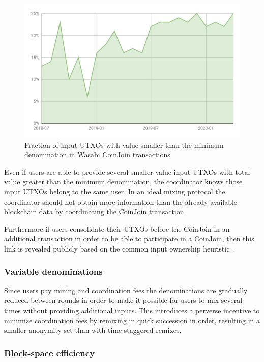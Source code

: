 \documentclass{article}
\begin{document}
\begin{figure}[h!]
    \centering
    \includegraphics[scale=0.4]{Figures/SmallValueInputsWasabi.pdf}
    \caption{Fraction of input UTXOs with value smaller than the minimum denomination in Wasabi CoinJoin transactions}
    \label{fig:minimumdenomination}
\end{figure}

Even if users are able to provide several smaller value input UTXOs with total value greater than the minimum denomination, the coordinator knows those input UTXOs belong to the same user.  In an ideal mixing protocol the coordinator should not obtain more information than the already available blockchain data by coordinating the CoinJoin transaction.

Furthermore if users consolidate their UTXOs before the CoinJoin in an additional transaction in order to be able to participate in a CoinJoin, then this link is revealed publicly based on the common input ownership heuristic~\cite{meiklejohn2013fistful}.

\subsubsection{Variable denominations} Since users pay mining and coordination fees the denominations are gradually reduced between rounds in order to make it possible for users to mix several times without providing additional inputs. This introduces a perverse incentive to minimize coordination fees by remixing in quick succession in order, resulting in a smaller anonymity set than with time-staggered remixes.

\subsubsection{Block-space efficiency}
\end{document}
